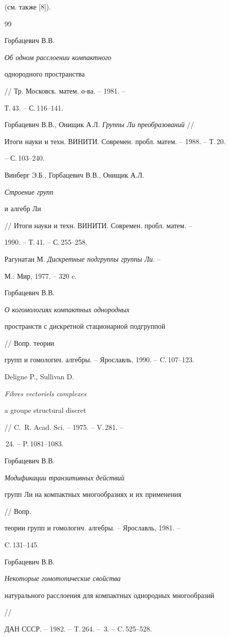 (см. также [8]).





\begin{thebibliography}{99}







Горбацевич В.В. {\em Об одном расслоении компактного


однородного пространства} // Тр. Московск. матем. о-ва. -- 1981. --


Т.\,43. -- С.\,116--141.




Горбацевич В.В., Онищик А.Л. {\em Группы Ли преобразований} //


Итоги науки и техн. ВИНИТИ. Современ. пробл. матем. -- 1988. -- Т.\,20.


-- С.\,103--240.




Винберг Э.Б., Горбацевич В.В., Онищик А.Л. {\em Строение групп


и алгебр Ли} // Итоги науки и техн. ВИНИТИ. Современ. пробл. матем. --


1990. -- Т.\,41. -- С.\,255--258.




Рагунатан М. {\em Дискретные подгруппы группы Ли}. --


М.: Мир, 1977. -- 320 c.




Горбацевич В.В. {\em О когомологиях компактных однородных


пространств с дискретной стационарной подгруппой} // Вопр. теории


групп и гомологич. алгебры. -- Ярославль, 1990. -- C.\,107--123.




Deligne P., Sullivan D. {\em Fibres vectoriels complexes


a groupe structural discret} // C.~R. Acad. Sci. -- 1975. -- V.\,281. --


\No\,24. -- P.\,1081--1083.




Горбацевич В.В. {\em Модификации транзитивных действий


групп Ли на компактных многообразиях и их применения} // Вопр.


теории групп и гомологич. алгебры. -- Ярославль, 1981. --


C.\,131--145.




Горбацевич В.В. {\em Некоторые гомотопические свойства


натурального расслоения для компактных однородных многообразий} //


ДАН СССР. -- 1982. -- T.\,264. -- \No\,3. -- C.\,525--528.





\end{thebibliography}





